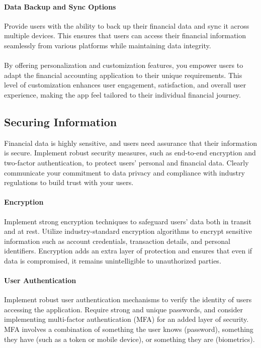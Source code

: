 \paragraph{Data Backup and Sync Options}
Provide users with the ability to back up their financial data and sync it across multiple devices. This ensures 
that users can access their financial information seamlessly from various platforms while maintaining data integrity.\\
\\

By offering personalization and customization features, you empower users to adapt the financial accounting 
application to their unique requirements. This level of customization enhances user engagement, satisfaction, 
and overall user experience, making the app feel tailored to their individual financial journey.


\subsection{Securing Information}

Financial data is highly sensitive, and users need assurance that their information is secure. Implement robust 
security measures, such as end-to-end encryption and two-factor authentication, to protect users' personal and 
financial data. Clearly communicate your commitment to data privacy and compliance with industry regulations to 
build trust with your users.

\paragraph{Encryption}
Implement strong encryption techniques to safeguard users' data both in transit and at rest. Utilize 
industry-standard encryption algorithms to encrypt sensitive information such as account credentials, transaction 
details, and personal identifiers. Encryption adds an extra layer of protection and ensures that even if data is 
compromised, it remains unintelligible to unauthorized parties.

\paragraph{User Authentication}
Implement robust user authentication mechanisms to verify the identity of users accessing the 
application. Require strong and unique passwords, and consider implementing multi-factor authentication (MFA) for 
an added layer of security. MFA involves a combination of something the user knows (password), something they have 
(such as a token or mobile device), or something they are (biometrics).


